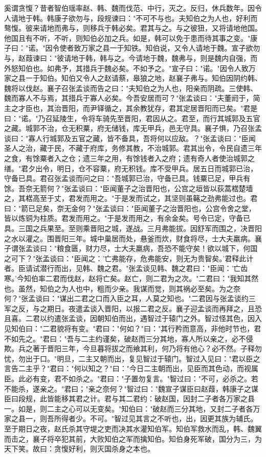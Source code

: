 \documentclass[]{article}
\begin{document}
奚谓贪愎？昔者智伯瑶率赵、韩、魏而伐范、中行，灭之。反归，休兵数年。因令人请地于韩。韩康子欲勿与，段规谏曰："不可不与也。夫知伯之为人也，好利而骜愎。彼来请地而弗与，则移兵于韩必矣。君其与之。与之彼狃，又将请地他国。他国且有不听，不听，则知伯必加之兵。如是，韩可以免于患而待其事之变。"康子曰："诺。"因令使者致万家之县一于知铁。知伯说，又令人请地于魏。宣子欲勿与，赵葭谏曰："彼请地于韩，韩与之。今请地于魏，魏弗与，则是魏内自强，而外怒知伯也。如弗予，其措兵于魏必矣。不如予之。"宣子曰："诺。"因令人致万家之县一于知伯。知伯又令人之赵请蔡，皋狼之地，赵襄子弗与。知伯因阴约韩、魏将以伐赵。襄子召张孟谈而告之曰："夫知伯之为人也，阳亲而阴疏。三使韩、魏而寡人不与焉，其措兵于寡人必矣。今吾安居而可？"张孟谈曰："夫董阏于，简主之才臣也，其治晋阳，而尹铎循之，其余教犹存，君其定居晋阳而已矣。"君是曰："诺。"乃召延陵生，令将车骑先至晋阳，君因从之。君至，而行其城郭及五官之藏。城郭不治，仓无积粟，府无储钱，库无甲兵，邑无守具。襄子惧，乃召张孟谈曰："寡人行城郭及五官之藏，皆不备具，吾将何以应敌。？"张孟谈曰："臣闻圣人之治，藏于民，不藏于府库，务修其教，不治城郭。君其出令，令民自遗三年之食，有馀粟者入之仓；遗三年之用，有馀钱者入之府；遗有奇人者使治城郭之缮。"君夕出令，明日，仓不容粟，府无积钱。库不受甲兵。居五日而城郭已治，守备已具。君召张孟谈而问之曰："吾城郭已治，守备已具。钱粟已足，甲兵有馀。吾奈无箭何？"张孟谈曰："臣闻董子之治晋阳也，公宫之垣皆以荻蒿楛楚墙之，其楛高至于丈，君发而用之。"于是发而试之，其坚则虽簵之劲弗能过也。君曰："箭已足矣，奈无金何？"张孟谈曰："臣闻董子之治晋阳也，公宫令舍之堂，皆以炼铜为柱质。君发而用之。"于是发而用之，有余金矣。号令已定，守备已具。三国之兵果至。至则乘晋阳之城，遂战。三月弗能拔。因舒军而围之，决晋阳之水以灌之。围晋阳三年。城中巢居而处，悬釜而炊，财食将尽，士大夫羸病。襄子谓张孟谈曰："粮食匮，财力尽，士大夫羸病，吾恐不能守矣！欲以城下，何国之可下？"张孟谈曰："臣闻之：'亡弗能存，危弗能安，则无为贵智矣。'君释此计者。臣请试潜行而出，见韩、魏之君。"张孟谈见韩、魏之君曰："臣闻：'亡齿寒。'今知伯率二君而伐赵，赵将亡矣。赵亡，则二君为之次。"二君曰："我知其然也。虽然，知伯之为人也中，粗而少亲。我谋而觉，则其祸必至矣。为之奈何？"张孟谈曰："谋出二君之口而入臣之耳，人莫之知也。"二君因与张孟谈约三军之反，与之期日。夜遣孟谈入晋阳，以报二君之反。襄子迎孟谈而再拜之，且恐且喜。二君以约遣张孟谈，因朝知伯而出，遇智过于辕门之外。智过怪其色，因入见知伯曰："二君貌将有变。"君曰："何如？"曰："其行矜而意高，非他时节也，君不如先之。"君曰："吾与二主约谨矣，破赵而三分其地，寡人所以亲之，必不侵欺。兵之著于晋阳三年，今旦暮将拔之而飨其利，何乃将有他心？必不然。子释勿忧，勿出于口。"明旦，二主又朝而出，复见智过于辕门。智过入见曰："君以臣之言告二主乎？"君曰："何以知之？"曰："今日二主朝而出，见臣而其色动，而视属臣。此必有变，君不如杀之。"君曰："子置勿复言。"智过曰："不可，必杀之。若不能杀，遂亲之。"君曰；"亲之奈何？"智过曰："魏宣子谋臣曰赵葭，韩康子之谋臣曰段规，此皆能移其君之计。君与其二君约：破赵国，因封二子者各万家之县一。如是，则二主之心可以无变矣。"知伯曰："破赵而三分其地，又封二子者各万家之县一，则吾所得者少。不可。"智过见其言之不听也，出，因更其族为辅氏。至于期日之夜，赵氏杀其守堤之吏而决其水灌知伯军。知伯军救水而乱，韩、魏翼而击之，襄子将卒犯其前，大败知伯之军而擒知伯。知伯身死军破，国分为三，为天下笑。故曰：贪愎好利，则灭国杀身之本也。
\end{document}
